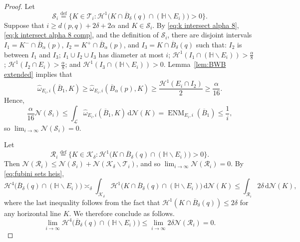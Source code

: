 \documentclass[11pt,reqno]{amsart}
\newcommand{\wwidehat}[1]{\widehat{#1}}
\newcommand{\cR}{\mathcal{R}}
\renewcommand{\H}{\mathbb{H}}
\newcommand{\cH}{\mathcal{H}}
\newcommand{\cK}{\mathcal{K}}
\newcommand{\cL}{\mathcal{L}}
\newcommand{\cN}{\mathcal{N}}
\newcommand{\cS}{\mathcal{S}}
\newcommand{\cT}{\mathcal{T}}
\renewcommand{\epsilon}{\varepsilon}
\renewcommand{\approx}{\asymp}
\newcommand{\ud}[0]{\,\mathrm{d}}
\newcommand{\0}{\mathbf{0}}
\renewcommand{\1}{\mathbf 1}
\renewcommand{\mid}{:}
\renewcommand{\subset}{\subseteq}
\newcommand{\eqdef}{\stackrel{\mathrm{def}}{=}}
\renewcommand{\ge}{\geqslant}
\renewcommand{\le}{\leqslant}
\renewcommand{\setminus}{\smallsetminus}
\newtheorem{lemma}[thm]{Lemma}
\theoremstyle{remark}
\DeclareMathOperator{\ENM}{ENM}
\DeclareMathOperator{\inter}{int}
\begin{document}
\begin{proof}
  Let
  $$\cS_i\eqdef\big\{K\in \cT_i\mid \cH^1\big(K \cap \overline{B}_\delta(q) \cap (\H\setminus E_i)\big)>0\big\}.
    $$
    Suppose that $i\ge d(p,q)+2\delta+2\alpha$ and $K\in \cS_i$.  By \eqref{eq:k intersect alpha 8}, \eqref{eq:k intersect alpha 8 comp}, and the definition of $\cS_i$, there are disjoint intervals $I_1=K^-\cap \overline{B}_\alpha(p)$, $I_2=K^+\cap \overline{B}_\alpha(p)$, and $I_3=K \cap \overline{B}_\delta(q)$ such that: $I_2$ is between $I_1$ and $I_3$; $I_1\cup I_2\cup I_3$ has diameter at most $i$; $\cH^1(I_1\cap (\H\setminus E_i))>\frac{\alpha}{8}$; $\cH^1(I_2\cap E_i)>\frac{\alpha}{8}$; and $\cH^1(I_3 \cap (\H\setminus E_i))>0$.  Lemma~\ref{lem:BWB extended} implies that
  $$\wwidehat{\omega}_{E_i,i}(\overline{B}_1,K) \ge \wwidehat{\omega}_{E_i,i}(\overline{B}_\alpha(p),K) \ge \frac{\cH^1(E_i\cap I_2)}{2} \ge \frac{\alpha}{16}.$$
 Hence,
  $$\frac{\alpha}{16} \cN(\cS_i)\le \int_\cL \wwidehat{\omega}_{E_i, i}(\overline{B}_1, K)\ud \cN(K)= \ENM_{E_i,i}(\overline{B}_1)\le \frac{1}{i},$$
  so $\lim_{i\to \infty} \cN(\cS_i)=0.$

  Let
  $$
  \cR_i\eqdef \big\{K\in \cK_\delta\mid \cH^1\big(K \cap \overline{B}_\delta(q) \cap (\H\setminus  E_i)\big)>0\big\}.
  $$  Then
  $\cN(\cR_i)\le \cN(\cS_i) + \cN(\cK_\delta\setminus \cT_i)$, and so $\lim_{i\to \infty} \cN(\cR_i)=0$.  By \eqref{eq:fubini sets heis},
  $$\cH^4\big(\overline{B}_\delta(q) \cap (\H\setminus E_i)\big) \approx_\delta \int_{\cK_\delta} \cH^1\big(K\cap \overline{B}_\delta(q) \cap (\H\setminus E_i)\big) \ud\cN(K)\le \int_{\cR_i} 2\delta \ud\cN(K),$$
  where the last inequality follows from the fact that $\cH^1(K\cap \overline{B}_\delta(q))\le 2\delta$ for any horizontal line $K$.  We therefore conclude as follows.
  \begin{equation*}
  \lim_{i\to \infty} \cH^4\big(\overline{B}_\delta(q) \cap (\H\setminus E_i)\big) \le \lim_{i\to \infty} 2\delta \cN(\cR_i)=0.
  \tag*{\qedhere}
  \end{equation*}
\end{proof}


\end{document}
